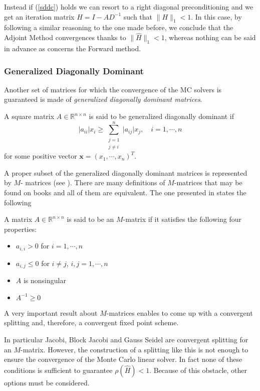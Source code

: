 Instead if (\ref{sddc}) holds we can resort to a right diagonal preconditioning
and we
get an iteration matrix $H=I-AD^{-1}$ such that $\lVert H \rVert_{1}<1$.
In this case, by following a similar reasoning to the one made before, we
conclude that the Adjoint Method convergences thanks to $\lVert
\hat{H}\rVert_1<1$,
whereas nothing can be said in advance as concerns the Forward method.

\subsubsection{Generalized Diagonally Dominant}

 Another set of matrices for which the convergence of
the MC solvers is guaranteed is made of \textit{generalized diagonally
dominant matrices}.

\begin{defn}
A square matrix $A\in\mathbb{R}^{n\times n}$ is said to be generalized
diagonally dominant if
\[
 \lvert a_{ii}\rvert x_i \ge \sum_{\substack{j=1\\j\ne i}}^n \lvert
a_{ij}\rvert
x_j, \quad i=1,\cdots,n
\]
for some positive vector $\mathbf{x}=(x_1,\cdots,x_n)^T$.
\end{defn}

A proper subset of the generalized diagonally dominant matrices is represented
by $M$- matrices (see \cite{Ax1996}).
There are many definitions of $M$-matrices that may be found on books and all
of them are equivalent. The one presented in \cite{Saad} states the
following

\begin{defn}
A matrix $A\in\mathbb{R}^{n\times n}$ is said to be an $M$-matrix if it
satisfies the following four properties:
\begin{itemize}
 \item $a_{i,i}>0$ for $i=1,\cdots,n$
 \item $a_{i,j}\le 0$ for $i\ne j$, $i,j=1,\cdots,n$
 \item $A$ is nonsingular
 \item $A^{-1}\ge 0$
\end{itemize}
\end{defn}


A very important result about $M$-matrices enables to come up with a convergent
splitting and, therefore, a convergent fixed point scheme.

In particular Jacobi, Block Jacobi and Gauss Seidel  are
convergent
splitting for an $M$-matrix.
However, the construction of a splitting like this is not enough to ensure the
convergence of
the Monte Carlo linear solver. In fact none of these conditions is sufficient
to guarantee $\rho(\hat{H})<1$. Because of this obstacle, other options must
be considered.\newline

